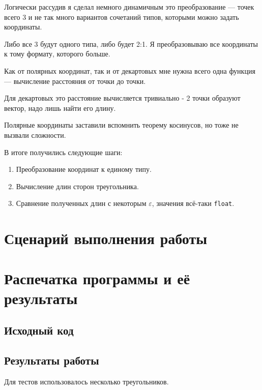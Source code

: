 \documentclass[12pt]{article}
\begin{document}
Логически рассудив я сделал немного динамичным это преобразование ---
точек всего 3 и не так много вариантов сочетаний типов, которыми можно задать координаты.

Либо все 3 будут одного типа, либо будет 2:1. Я преобразовываю все координаты к
тому формату, которого больше.

\smallbreak

Как от полярных координат, так и от декартовых мне нужна всего одна функция ---
вычисление расстояния от точки до точки.

Для декартовых это расстояние вычисляется тривиально - 2 точки образуют вектор,
надо лишь найти его длину.

Полярные координаты заставили вспомнить теорему косинусов,
но тоже не вызвали сложности.

В итоге получились следующие шаги:
\begin{enumerate}
  \item Преобразование координат к единому типу.
  \item Вычисление длин сторон треугольника.
  \item Сравнение полученных длин с некоторым $\varepsilon$, значения всё-таки {\tt float}.
\end{enumerate}
\section{Сценарий выполнения работы}
\section{Распечатка программы и её результаты}

\subsection{Исходный код}

\newpage

\subsection{Результаты работы}

Для тестов использовалось несколько треугольников.
\end{document}

